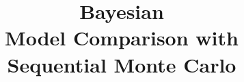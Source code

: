 \def\inthesis{}

\title{Bayesian \\Model Comparison with \\Sequential Monte Carlo}



\frontmatter
\maketitle
\tableofcontents

\mainmatter










\backmatter
\printbibliography


